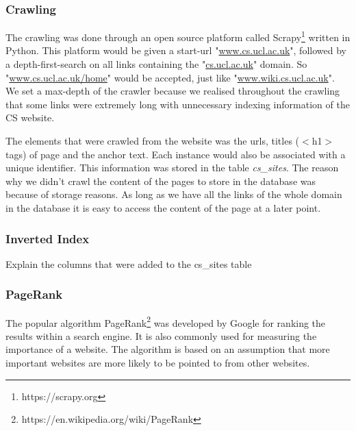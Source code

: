
\subsubsection{Crawling} %
\label{ssub:crawling}

The crawling was done through an open source platform called Scrapy\footnote{https://scrapy.org} written in Python. This platform would be given a start-url "\url{www.cs.ucl.ac.uk}", followed by a depth-first-search on all links containing the "\url{cs.ucl.ac.uk}" domain. So "\url{www.cs.ucl.ac.uk/home}" would be accepted, just like "\url{www.wiki.cs.ucl.ac.uk}". We set a max-depth of the crawler because we realised throughout the crawling that some links were extremely long with unnecessary indexing information of the CS website.

The elements that were crawled from the website was the urls, titles ($<$h1$>$ tags) of page and the anchor text. Each instance would also be associated with a unique identifier. This information was stored in the table \emph{cs\_sites}. The reason why we didn't crawl the content of the pages to store in the database was because of storage reasons. As long as we have all the links of the whole domain in the database it is easy to access the content of the page at a later point.


\subsubsection{Inverted Index} %
\label{ssub:inverted_index}

Explain the columns that were added to the cs\_sites table


\subsubsection{PageRank} %
\label{ssub:pagerank}

The popular algorithm PageRank\footnote{https://en.wikipedia.org/wiki/PageRank} was developed by Google for ranking the results within a search engine. It is also commonly used for measuring the importance of a website. The algorithm is based on an assumption that more important websites are more likely to be pointed to from other websites.

